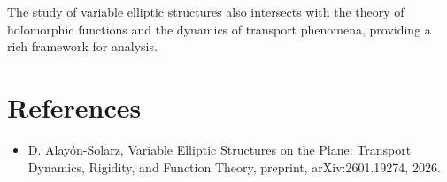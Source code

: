 \documentclass[11pt,a4paper]{article}
\begin{document}
The study of variable elliptic structures also intersects with the theory of holomorphic functions and the dynamics of transport phenomena, providing a rich framework for analysis.

\section{References}
\begin{itemize}
    \item D. Alayón-Solarz, Variable Elliptic Structures on the Plane: Transport Dynamics, Rigidity, and Function Theory, preprint, arXiv:2601.19274, 2026.
\end{itemize}
\end{document}

